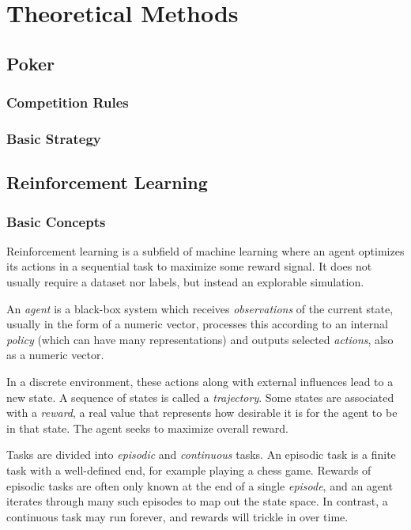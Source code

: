 \chapter{Theoretical Methods}


\section{Poker}

\subsection{Competition Rules}

\subsection{Basic Strategy}

\section{Reinforcement Learning}
\subsection{Basic Concepts}
Reinforcement learning is a subfield of machine learning where an agent optimizes its actions in a sequential task to maximize some reward signal. It does not usually require a dataset nor labels, but instead an explorable simulation.

An \textit{agent} is a black-box system which receives \textit{observations} of the current state, usually in the form of a numeric vector, processes this according to an internal \textit{policy} (which can have many representations) and outputs selected \textit{actions}, also as a numeric vector.

In a discrete environment, these actions along with external influences lead to a new state. A sequence of states is called a \textit{trajectory}. Some states are associated with a \textit{reward}, a real value that represents how desirable it is for the agent to be in that state. The agent seeks to maximize overall reward.

Tasks are divided into \textit{episodic} and \textit{continuous} tasks.  An episodic task is a finite task with a well-defined end, for example playing a chess game. Rewards of episodic tasks are often only known at the end of a single \textit{episode}, and an agent iterates through many such episodes to map out the state space. In contrast, a continuous task may run forever, and rewards will trickle in over time. 

